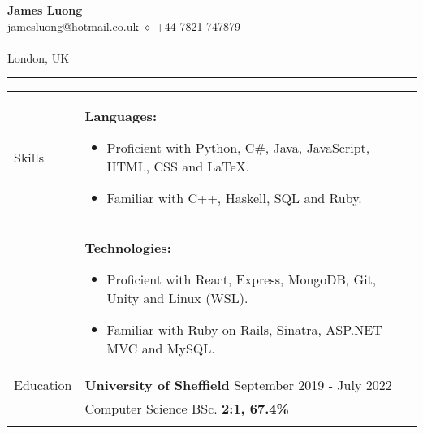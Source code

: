 \documentclass[11pt]{article}
\begin{document}
\begin{minipage}[t][0pt]{\linewidth} %
\begin{center}
	{\LARGE\textbf{James Luong}} \\
	jamesluong@hotmail.co.uk $\diamond$ +44 7821 747879 \\
	
	\href{jluong23.github.io/blog}{\color{Blue}{jluong23.github.io/blog}} \\
	
	London, UK \\
	\hrule
\end{center}


\begin{tabular}[t]{p{2cm} p{14cm}}
	{Skills} &
		\textbf{Languages:} 
	    \begin{itemize}
    		\renewcommand{\labelitemi}{$\diamond$}
    			\item Proficient with Python, C\#, Java, JavaScript, HTML, CSS and \LaTeX. 
    			\item Familiar with C++, Haskell, SQL and Ruby.
		\end{itemize} \\ &

		\textbf{Technologies:} 
	    \begin{itemize}
    		\renewcommand{\labelitemi}{$\diamond$}
    			\item Proficient with React, Express, MongoDB, Git, Unity and Linux (WSL).
    			\item Familiar with Ruby on Rails, Sinatra, ASP.NET MVC and MySQL.
		\end{itemize} \\
	{Education} &

		\textbf{University of Sheffield} \hfill September 2019 - July 2022 \\ &
		Computer Science BSc. \hfill \textbf{2:1, 67.4\%}  \\ &


\end{tabular}
\end{minipage}
\end{document}
